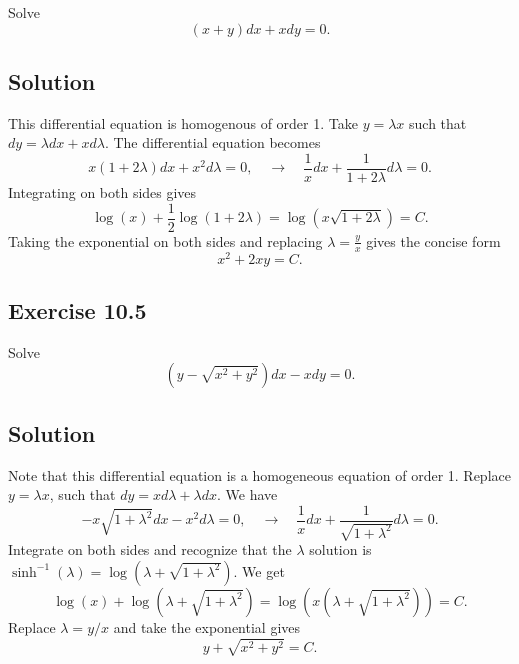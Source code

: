 Solve
\begin{equation*}
    (x + y)dx + xdy = 0.
\end{equation*}

\subsection*{Solution}

This differential equation is homogenous of order 1.
Take $y = \lambda x$ such that $dy = \lambda dx + x d\lambda$.
The differential equation becomes
\begin{equation*}
    x(1 + 2\lambda) dx + x^2 d\lambda = 0, \quad \rightarrow \quad \frac{1}{x} dx + \frac{1}{1 + 2\lambda} d\lambda = 0.
\end{equation*}
Integrating on both sides gives
\begin{equation*}
    \log(x) + \frac{1}{2} \log(1 + 2\lambda) = \log(x \sqrt{1 + 2\lambda}) = C.
\end{equation*}
Taking the exponential on both sides and replacing $\lambda = \frac{y}{x}$ gives the concise form
\begin{equation*}
    x^2 + 2xy = C.
\end{equation*}


\subsection*{Exercise 10.5}

Solve
\begin{equation*}
    (y - \sqrt{x^2 + y^2})dx - xdy = 0.
\end{equation*}

\subsection*{Solution}

Note that this differential equation is a homogeneous equation of order 1.
Replace $y = \lambda x$, such that $dy = xd\lambda + \lambda dx$.
We have
\begin{equation*}
    -x\sqrt{1 + \lambda^2} dx - x^2 d\lambda = 0, \quad \rightarrow \quad \frac{1}{x} dx + \frac{1}{\sqrt{1 + \lambda^2}} d\lambda = 0.
\end{equation*}
Integrate on both sides and recognize that the $\lambda$ solution is $\sinh^{-1}(\lambda) = \log(\lambda + \sqrt{1 + \lambda^2})$.
We get
\begin{equation*}
    \log(x) + \log(\lambda + \sqrt{1 + \lambda^2}) = \log(x(\lambda + \sqrt{1 + \lambda^2})) = C.
\end{equation*}
Replace $\lambda = y/x$ and take the exponential gives
\begin{equation*}
    y + \sqrt{x^2 + y^2} = C.
\end{equation*}


